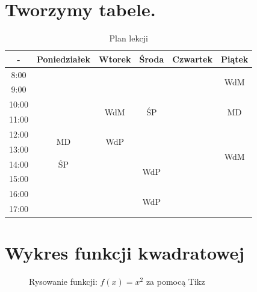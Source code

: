 \documentclass[oneside, fleqn]{book}
\begin{document}
\section{Tworzymy tabele.}
\begin{table}[htbp]
\begin{tabular}{|c|c|c|c|c|c|}\hline
- & Poniedziałek & Wtorek & Środa & Czwartek & Piątek \\ \hline
8:00 & & & & & \multirow{2}{*}{WdM} \\ \cline{1-5}
9:00 & & & & & \\ \hline
10:00 & & \multirow{2}{*}{WdM} & \multirow{2}{*}{ŚP} & & \multirow{2}{*}{MD} \\ \cline{1-2} \cline{5-5}
11:00 & & & & & \\ \hline
12:00 & \multirow{2}{*}{MD} & \multirow{2}{*}{WdP} & & & \\ \cline{1-1} \cline{4-6}
13:00 & & & & & \multirow{2}{*}{WdM} \\ \cline{1-5}
14:00 & ŚP & & \multirow{2}{*}{WdP} & &  \\ \cline{1-3} \cline{5-6}
15:00 & & & & &  \\ \hline
16:00 & & & \multirow{2}{*}{WdP} & &  \\ \cline{1-3} \cline{5-6}
17:00 & & & & &  \\ \hline
\end{tabular}
\caption{Plan lekcji}
\end{table}


\newpage

\section{Wykres funkcji kwadratowej} 

\begin{figure}[htbp]
\caption{Rysowanie funkcji: $f(x)=x^2$ za pomocą Tikz}
\end{figure}
\end{document}
